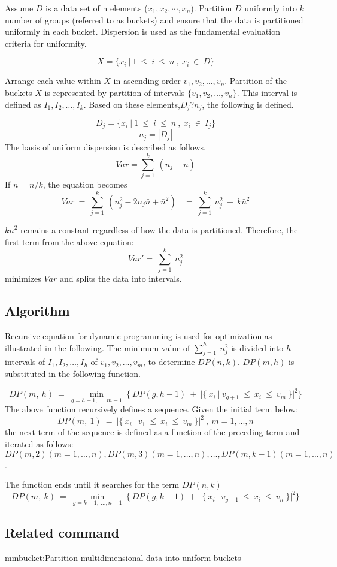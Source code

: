 \documentclass[a4paper]{jarticle}
\begin{document}
Assume $D$ is a data set of n elements ($x_1,x_2,\cdots,x_n$).
Partition $D$ uniformly into $k$ number of groups (referred to as buckets) and ensure that the data is partitioned uniformly in each bucket. Dispersion is used as the fundamental evaluation criteria for uniformity.

\[
X=\{x_i~|~1~\leq~i~\leq~n~,~x_i~\in~D\}
\]

Arrange each value within $X$ in  ascending order $v_1,v_2,\dots,v_n$.
Partition of the buckets $X$ is represented by partition of intervals  $\{v_1,v_2,\dots,v_n\}$.
This interval is defined as $I_1,I_2,\dots,I_k$. Based on these elements,$D_j$?$n_j$, the following is defined.

\[
 D_j=\{x_i~|~1~\leq~i~\leq~n~,~x_i~\in~I_j\}
  \]
  \[
 n_j=|D_j|
 \]
The basis of uniform dispersion is described as follows. \\
\[
Var=\sum_{j=1}^{k}~(n_j-\bar{n})
\]
If $\bar{n}=n/k$, the equation becomes\\
\[
Var~=~\sum_{j=1}^{k}~(n_j^2-2n_j\bar{n}+\bar{n}^2)~~~~=~\sum_{j=1}^{k}~n_j^2~-~k\bar{n}^2
\]

$k\bar{n}^2$ remains a constant regardless of how the data is partitioned. Therefore, the first term from the above equation:  
\[
Var'=~\sum_{j=1}^{k}~n_j^2
\]
minimizes $Var$ and splits the data into intervals. 


\subsection*{Algorithm}

Recursive equation for dynamic programming is used for optimization as illustrated in the following. 
The minimum value of $\displaystyle \sum_{j=1}^{h}~n_j^2$
is divided into $h$ intervals of $I_1,I_2,\dots,I_h$  of $v_1,v_2,\dots,v_m$, to determine  $DP(n,k)$. 
 $DP(m,h)$ is substituted in the following function.

\[
DP(m,~h)~=~\min_{g=h-1,~\dots,m-1}~\{~DP(g,h-1)~+~|\{~x_i~|~v_{g+1}~\leq~x_i~\leq~v_m~\}|^2\}
\]
The above function recursively defines a sequence. Given the initial term below: 
\[
DP(m,~1)~=~|\{~x_i~|~v_1~\leq~x_i~\leq~v_m~\}|^2~,~m=1,...,n
\]
the next term of the sequence is defined as a function of the preceding term and iterated as follows:
$DP(m,2)(m=1,\dots,n),DP(m,3)(m=1,\dots,n),\dots,DP(m,k-1)(m=1,\dots,n)$.

The function ends until it searches for the term $DP(n,k)$
\[
DP(m,~k)~=~\min_{g=k-1,~\dots,n-1}~\{~DP(g,k-1)~+~|\{~x_i~|~v_{g+1}~\leq~x_i~\leq~v_n~\}|^2\}
\]

\subsection*{Related command}
\noindent
\href{run:mmbucket.pdf}{mmbucket}:Partition multidimensional data into uniform buckets \\
\end{document}
